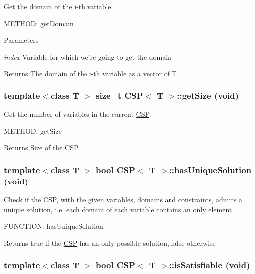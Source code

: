 Get the domain of the i-\/th variable. 

METHOD: getDomain 
\begin{DoxyParams}{Parameters}
\item[{\em index}]Variable for which we're going to get the domain \end{DoxyParams}
\begin{DoxyReturn}{Returns}
The domain of the i-\/th variable as a vector of T 
\end{DoxyReturn}
\hypertarget{classCSP_a91a0e89bc1882d39b88122bee392c5f3}{
\subsubsection[{getSize}]{\setlength{\rightskip}{0pt plus 5cm}template$<$class T $>$ size\_\-t {\bf CSP}$<$ T $>$::getSize (void)}}
\label{classCSP_a91a0e89bc1882d39b88122bee392c5f3}


Get the number of variables in the current \hyperlink{classCSP}{CSP}. 

METHOD: getSize \begin{DoxyReturn}{Returns}
Size of the \hyperlink{classCSP}{CSP} 
\end{DoxyReturn}
\hypertarget{classCSP_ae96286c6c7dfb6fe077544e0d4af15f4}{
\subsubsection[{hasUniqueSolution}]{\setlength{\rightskip}{0pt plus 5cm}template$<$class T $>$ bool {\bf CSP}$<$ T $>$::hasUniqueSolution (void)}}
\label{classCSP_ae96286c6c7dfb6fe077544e0d4af15f4}


Check if the \hyperlink{classCSP}{CSP}, with the given variables, domains and constraints, admits a unique solution, i.e. each domain of each variable contains an only element. 

FUNCTION: hasUniqueSolution \begin{DoxyReturn}{Returns}
true if the \hyperlink{classCSP}{CSP} has an only possible solution, false otherwise 
\end{DoxyReturn}
\hypertarget{classCSP_a7ef9eb91c38815c9d82182696a6bd5d3}{
\subsubsection[{isSatisfiable}]{\setlength{\rightskip}{0pt plus 5cm}template$<$class T $>$ bool {\bf CSP}$<$ T $>$::isSatisfiable (void)}}
\label{classCSP_a7ef9eb91c38815c9d82182696a6bd5d3}


